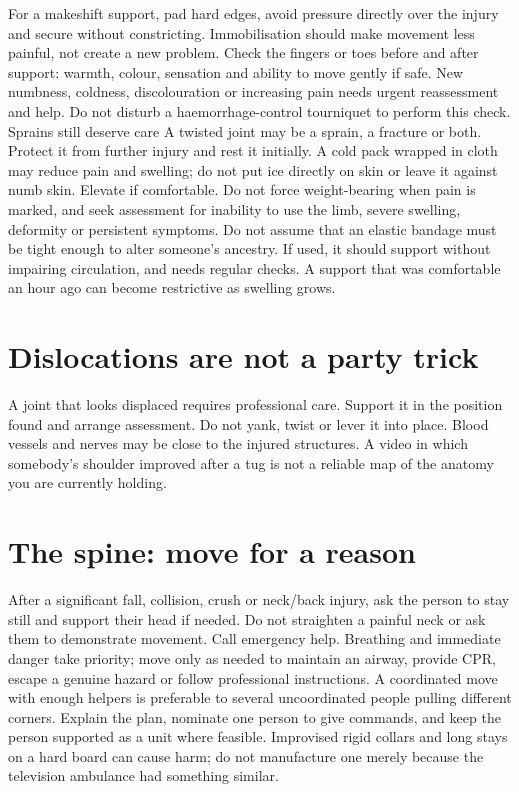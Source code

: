 \documentclass[10pt,openright]{book}
\begin{document}
For a makeshift support, pad hard edges, avoid pressure directly over the injury and secure without constricting. Immobilisation should make movement less painful, not create a new problem. Check the fingers or toes before and after support: warmth, colour, sensation and ability to move gently if safe. New numbness, coldness, discolouration or increasing pain needs urgent reassessment and help. Do not disturb a haemorrhage-control tourniquet to perform this check. Sprains still deserve care A twisted joint may be a sprain, a fracture or both. Protect it from further injury and rest it initially. A cold pack wrapped in cloth may reduce pain and swelling; do not put ice directly on skin or leave it against numb skin. Elevate if comfortable. Do not force weight-bearing when pain is marked, and seek assessment for inability to use the limb, severe swelling, deformity or persistent symptoms. Do not assume that an elastic bandage must be tight enough to alter someone's ancestry. If used, it should support without impairing circulation, and needs regular checks. A support that was comfortable an hour ago can become restrictive as swelling grows.

\section*{Dislocations are not a party trick}
A joint that looks displaced requires professional care. Support it in the position found and arrange assessment. Do not yank, twist or lever it into place. Blood vessels and nerves may be close to the injured structures. A video in which somebody's shoulder improved after a tug is not a reliable map of the anatomy you are currently holding.

\section*{The spine: move for a reason}
After a significant fall, collision, crush or neck/back injury, ask the person to stay still and support their head if needed. Do not straighten a painful neck or ask them to demonstrate movement. Call emergency help. Breathing and immediate danger take priority; move only as needed to maintain an airway, provide CPR, escape a genuine hazard or follow professional instructions. A coordinated move with enough helpers is preferable to several uncoordinated people pulling different corners. Explain the plan, nominate one person to give commands, and keep the person supported as a unit where feasible. Improvised rigid collars and long stays on a hard board can cause harm; do not manufacture one merely because the television ambulance had something similar.
\end{document}
